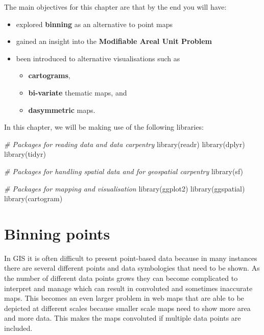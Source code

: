 \documentclass[
]{book}
\newenvironment{Shaded}{\begin{snugshade}}{\end{snugshade}}
\newcommand{\CommentTok}[1]{\textcolor[rgb]{0.56,0.35,0.01}{\textit{#1}}}
\newcommand{\FunctionTok}[1]{\textcolor[rgb]{0.00,0.00,0.00}{#1}}
\newcommand{\NormalTok}[1]{#1}
\providecommand{\tightlist}{%
  \setlength{\itemsep}{0pt}\setlength{\parskip}{0pt}}
\begin{document}
The main objectives for this chapter are that by the end you will have:

\begin{itemize}
\tightlist
\item
  explored \textbf{binning} as an alternative to point maps
\item
  gained an insight into the \textbf{Modifiable Areal Unit Problem}
\item
  been introduced to alternative visualisations such as

  \begin{itemize}
  \tightlist
  \item
    \textbf{cartograms},
  \item
    \textbf{bi-variate} thematic maps, and
  \item
    \textbf{dasymmetric} maps.
  \end{itemize}
\end{itemize}

In this chapter, we will be making use of the following libraries:

\begin{Shaded}
\begin{Highlighting}[]
\CommentTok{\# Packages for reading data and data carpentry}
\FunctionTok{library}\NormalTok{(readr)}
\FunctionTok{library}\NormalTok{(dplyr)}
\FunctionTok{library}\NormalTok{(tidyr)}

\CommentTok{\# Packages for handling spatial data and for geospatial carpentry}
\FunctionTok{library}\NormalTok{(sf)}

\CommentTok{\# Packages for mapping and visualisation}
\FunctionTok{library}\NormalTok{(ggplot2)}
\FunctionTok{library}\NormalTok{(ggspatial)}
\FunctionTok{library}\NormalTok{(cartogram)}
\end{Highlighting}
\end{Shaded}

\hypertarget{binning-points}{%
\section{Binning points}\label{binning-points}}

In GIS it is often difficult to present point-based data because in many instances there are several different points and data symbologies that need to be shown. As the number of different data points grows they can become complicated to interpret and manage which can result in convoluted and sometimes inaccurate maps. This becomes an even larger problem in web maps that are able to be depicted at different scales because smaller scale maps need to show more area and more data. This makes the maps convoluted if multiple data points are included.
\end{document}
